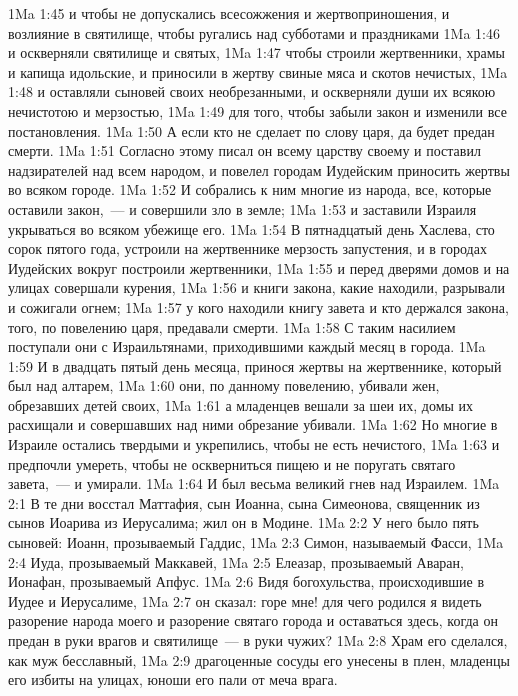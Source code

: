 \vs 1Ma 1:45 и чтобы не допускались всесожжения и жертвоприношения, и возлияние в святилище, чтобы ругались над субботами и праздниками
\vs 1Ma 1:46 и оскверняли святилище и святых,
\vs 1Ma 1:47 чтобы строили жертвенники, храмы и капища идольские, и приносили в жертву свиные мяса и скотов нечистых,
\vs 1Ma 1:48 и оставляли сыновей своих необрезанными, и оскверняли души их всякою нечистотою и мерзостью,
\vs 1Ma 1:49 для того, чтобы забыли закон и изменили все постановления.
\vs 1Ma 1:50 А если кто не сделает по слову царя, да будет предан смерти.
\vs 1Ma 1:51 Согласно этому писал он всему царству своему и поставил надзирателей над всем народом, и повелел городам Иудейским приносить жертвы во всяком городе.
\vs 1Ma 1:52 И собрались к ним многие из народа, все, которые оставили закон,~--- и совершили зло в земле;
\vs 1Ma 1:53 и заставили Израиля укрываться во всяком убежище его.
\rsbpar\vs 1Ma 1:54 В пятнадцатый день Хаслева, сто сорок пятого года, устроили на жертвеннике мерзость запустения, и в городах Иудейских вокруг построили жертвенники,
\vs 1Ma 1:55 и перед дверями домов и на улицах совершали курения,
\vs 1Ma 1:56 и книги закона, какие находили, разрывали и сожигали огнем;
\vs 1Ma 1:57 у кого находили книгу завета и кто держался закона, того, по повелению царя, предавали смерти.
\vs 1Ma 1:58 С таким насилием поступали они с Израильтянами, приходившими каждый месяц в города.
\vs 1Ma 1:59 И в двадцать пятый день месяца, принося жертвы на жертвеннике, который был над алтарем,
\vs 1Ma 1:60 они, по данному повелению, убивали жен, обрезавших детей своих,
\vs 1Ma 1:61 а младенцев вешали за шеи их, домы их расхищали и совершавших над ними обрезание убивали.
\vs 1Ma 1:62 Но многие в Израиле остались твердыми и укрепились, чтобы не есть нечистого,
\vs 1Ma 1:63 и предпочли умереть, чтобы не оскверниться пищею и не поругать святаго завета,~--- и умирали.
\vs 1Ma 1:64 И был весьма великий гнев над Израилем.
\vs 1Ma 2:1 В те дни восстал Маттафия, сын Иоанна, сына Симеонова, священник из сынов Иоарива из Иерусалима; жил он в Модине.
\vs 1Ma 2:2 У него было пять сыновей: Иоанн, прозываемый Гаддис,
\vs 1Ma 2:3 Симон, называемый Фасси,
\vs 1Ma 2:4 Иуда, прозываемый Маккавей,
\vs 1Ma 2:5 Елеазар, прозываемый Аваран, Ионафан, прозываемый Апфус.
\vs 1Ma 2:6 Видя богохульства, происходившие в Иудее и Иерусалиме,
\vs 1Ma 2:7 он сказал: горе мне! для чего родился я видеть разорение народа моего и разорение святаго города и оставаться здесь, когда он предан в руки врагов и святилище~--- в руки чужих?
\vs 1Ma 2:8 Храм его сделался, как муж бесславный,
\vs 1Ma 2:9 драгоценные сосуды его унесены в плен, младенцы его избиты на улицах, юноши его пали от меча врага.
